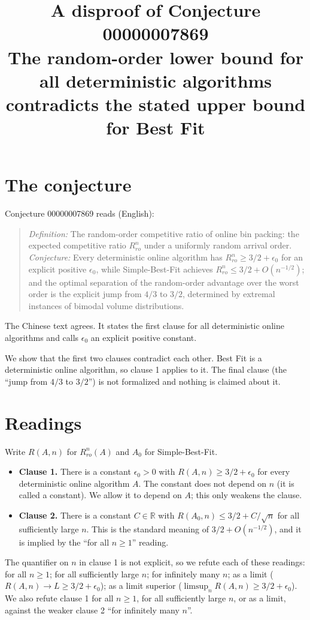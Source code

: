 \documentclass[11pt]{article}
\title{A disproof of Conjecture 00000007869\\[2pt]
\large The random-order lower bound for all deterministic algorithms contradicts the stated upper bound for Best Fit}
\date{}
\renewcommand{\_}{\oldus\allowbreak}
\theoremstyle{definition}
\theoremstyle{remark}
\begin{document}
\sloppy
\maketitle

\section{The conjecture}

Conjecture 00000007869 reads (English):
\begin{quote}
\emph{Definition:} The random-order competitive ratio of online bin packing: the expected
competitive ratio $R_{ro}^n$ under a uniformly random arrival order. \emph{Conjecture:} Every
deterministic online algorithm has $R_{ro}^n \ge 3/2 + \epsilon_0$ for an explicit positive
$\epsilon_0$, while Simple-Best-Fit achieves $R_{ro}^n \le 3/2 + O(n^{-1/2})$; and the optimal
separation of the random-order advantage over the worst order is the explicit jump from $4/3$ to
$3/2$, determined by extremal instances of bimodal volume distributions.
\end{quote}
The Chinese text agrees. It states the first clause for all deterministic online algorithms and
calls $\epsilon_0$ an explicit positive constant.

We show that the first two clauses contradict each other. Best Fit is a deterministic online
algorithm, so clause 1 applies to it. The final clause (the ``jump from $4/3$ to $3/2$'') is not
formalized and nothing is claimed about it.

\section{Readings}

Write $R(A,n)$ for $R_{ro}^n(A)$ and $A_0$ for Simple-Best-Fit.
\begin{itemize}[leftmargin=1.5em]
\item \textbf{Clause 1.} There is a constant $\epsilon_0>0$ with $R(A,n)\ge 3/2+\epsilon_0$ for every
  deterministic online algorithm $A$. The constant does not depend on $n$ (it is called a constant).
  We allow it to depend on $A$; this only weakens the clause.
\item \textbf{Clause 2.} There is a constant $C\in\mathbb{R}$ with
  $R(A_0,n)\le 3/2+C/\sqrt{n}$ for all sufficiently large $n$. This is the standard meaning of
  $3/2+O(n^{-1/2})$, and it is implied by the ``for all $n\ge1$'' reading.
\end{itemize}
The quantifier on $n$ in clause 1 is not explicit, so we refute each of these readings:
for all $n\ge 1$; for all sufficiently large $n$; for infinitely many $n$; as a limit
($R(A,n)\to L\ge 3/2+\epsilon_0$); as a limit superior ($\limsup_n R(A,n)\ge 3/2+\epsilon_0$).
We also refute clause 1 for all $n\ge1$, for all sufficiently large $n$, or as a limit, against
the weaker clause 2 ``for infinitely many $n$''.
\end{document}
